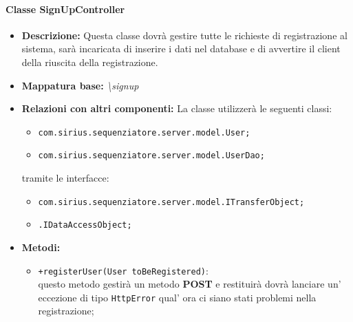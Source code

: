 \paragraph{Classe SignUpController}%
\begin{itemize}
	\item \textbf{Descrizione: } Questa classe dovrà gestire tutte le richieste di registrazione al sistema, sarà incaricata di inserire i dati nel database e di avvertire il client della riuscita della registrazione.
	\item \textbf{Mappatura base: }\textit{\textbackslash signup}
	\item \textbf{Relazioni con altri componenti: }
	La classe utilizzerà le seguenti classi:
	\begin{itemize}
		\item \texttt{com.sirius.sequenziatore.server.model.User;}
		\item \texttt{com.sirius.sequenziatore.server.model.UserDao;}
	\end{itemize}
	tramite le interfacce:
	\begin{itemize}
		\item \texttt{com.sirius.sequenziatore.server.model.ITransferObject;}
		\item \texttt{\sModel .IDataAccessObject;}
	\end{itemize}
	\item \textbf{Metodi: }\begin{itemize}
					\item \texttt{+registerUser(User toBeRegistered)}:\\
					 questo metodo gestirà un metodo \textbf{POST} e restituirà dovrà lanciare un' eccezione di tipo \texttt{HttpError} qual' ora ci siano stati problemi nella registrazione;
				\end{itemize}
\end{itemize}

